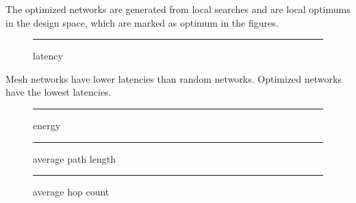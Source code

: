 \documentclass[12pt]{article}
\theoremstyle{definition}
\begin{document}
The optimized networks are generated from local searches and are local optimums in the design space, which are marked as optimum in the figures.
\begin{figure}[htb]
  \begin{subfigure} {\texttt{[image: latency\_benchmark]}} \end{subfigure}
  \rule{\linewidth}{1pt} \caption{latency}
\end{figure}

Mesh networks have lower latencies than random networks. Optimized networks have the lowest latencies.
\begin{figure}[htb]
  \begin{subfigure} {\texttt{[image: energy\_benchmark]}} \end{subfigure}
  \rule{\linewidth}{1pt} \caption{energy} \label{fig:energy_benchmark}
\end{figure}

\begin{figure}[htb]
  \begin{subfigure} {\texttt{[image: average\_path\_length\_benchmark.png]}} \end{subfigure}
  \rule{\linewidth}{1pt} \caption{average path length} \label{fig:average_path_length_benchmark}
\end{figure}

\begin{figure}[htb]
  \begin{subfigure} {\texttt{[image: average\_hop\_count\_benchmark.png]}} \end{subfigure}
  \rule{\linewidth}{1pt} \caption{average hop count} \label{fig:average_hop_count_benchmark}
\end{figure}
\end{document}
